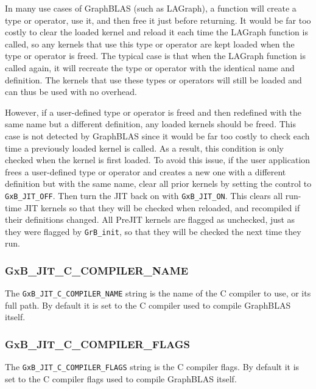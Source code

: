 In many use cases of GraphBLAS (such as LAGraph), a function will create a type
or operator, use it, and then free it just before returning.  It would be far
too costly to clear the loaded kernel and reload it each time the LAGraph
function is called, so any kernels that use this type or operator are kept
loaded when the type or operator is freed.  The typical case is that when the
LAGraph function is called again, it will recreate the type or operator with
the identical name and definition.  The kernels that use these types or
operators will still be loaded and can thus be used with no overhead.

However, if a user-defined type or operator is freed and then redefined with
the same name but a different definition, any loaded kernels should be freed.
This case is not detected by GraphBLAS since it would be far too costly to
check each time a previously loaded kernel is called.  As a result, this
condition is only checked when the kernel is first loaded.  To avoid this
issue, if the user application frees a user-defined type or operator and
creates a new one with a different definition but with the same name, clear all
prior kernels by setting the control to \verb'GxB_JIT_OFF'.  Then turn the JIT
back on with \verb'GxB_JIT_ON'.  This clears all run-time JIT kernels so that
they will be checked when reloaded, and recompiled if their definitions
changed.  All PreJIT kernels are flagged as unchecked, just as they were
flagged by \verb'GrB_init', so that they will be checked the next time they
run.

\subsubsection{\sf GxB\_JIT\_C\_COMPILER\_NAME}

The \verb'GxB_JIT_C_COMPILER_NAME' string is the name of the C compiler to use,
or its full path.
By default it is set to the C compiler used to compile GraphBLAS itself.

\subsubsection{\sf GxB\_JIT\_C\_COMPILER\_FLAGS}

The \verb'GxB_JIT_C_COMPILER_FLAGS' string is the C compiler flags.
By default it is set to the C compiler flags used to compile GraphBLAS itself.

